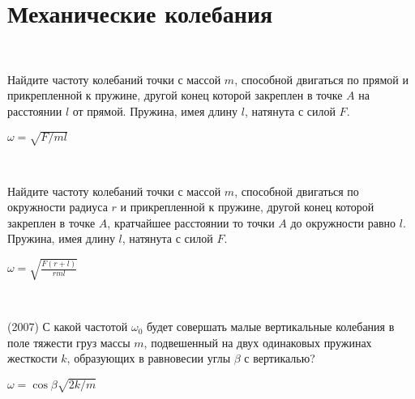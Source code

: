 \section{Механические колебания}


\begin{ex}
\hspace{0pt} \\
\begin{minipage}{.65\textwidth}
Найдите частоту колебаний точки с массой $m$, способной двигаться по прямой и прикрепленной к пружине, другой конец которой закреплен в точке $A$ на расстоянии $l$ от прямой. Пружина, имея длину $l$, натянута с силой $F$.
\end{minipage}
\begin{minipage}{.35\textwidth}
\centering

\end{minipage}
\begin{ans}
$\omega = \sqrt{F/ml}$
\end{ans}
\end{ex}

\begin{ex}
\hspace{0pt} \\
\begin{minipage}{.65\textwidth}
Найдите частоту колебаний точки с массой $m$, способной двигаться по окружности радиуса $r$ и прикрепленной к пружине, другой конец которой закреплен в точке $A$, кратчайшее расстоянии то точки $A$ до окружности равно $l$. Пружина, имея длину $l$, натянута с силой $F$.
\end{minipage}
\begin{minipage}{.35\textwidth}
\centering

\end{minipage}
\begin{ans}
$\omega = \sqrt{\frac{F(r+l)}{rml}}$
\end{ans}
\end{ex}

\begin{ex}
\hspace{0pt} \\
\begin{minipage}{.65\textwidth} 
(2007) С какой частотой $\omega_0$ будет совершать малые вертикальные колебания в поле тяжести груз массы $m$, подвешенный на двух одинаковых пружинах жесткости $k$, образующих в равновесии углы $\beta$ с вертикалью?
\end{minipage}
\begin{minipage}{.35\textwidth}
\centering

\end{minipage}
\begin{ans}
$\omega = \cos \beta \sqrt{2k/m}$
\end{ans}
\end{ex}

